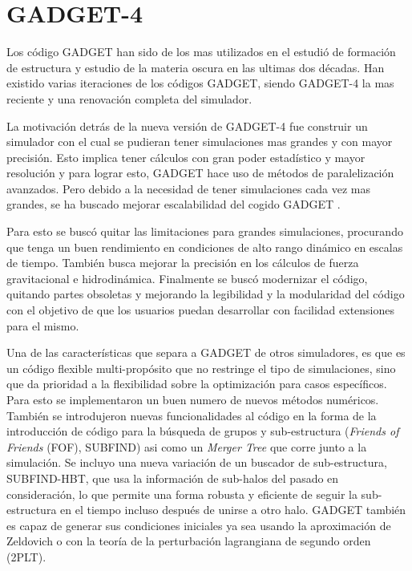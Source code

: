 \section{GADGET-4}

Los código GADGET han sido de los mas utilizados en el estudió de formación de estructura y estudio de la materia oscura en las ultimas dos décadas. Han existido varias iteraciones de los códigos GADGET, siendo GADGET-4 la mas reciente y una renovación completa del simulador. 

La motivación detrás de la nueva versión de GADGET-4 fue construir un simulador con el cual se pudieran tener simulaciones mas grandes y con mayor precisión. Esto implica tener cálculos con gran poder estadístico y mayor resolución y para lograr esto, GADGET hace uso de métodos de paralelización avanzados. Pero debido a la necesidad de tener simulaciones cada vez mas grandes, se ha buscado mejorar escalabilidad del cogido GADGET \cite{2021MNRAS.506.2871S}.

Para esto se buscó quitar las limitaciones para grandes simulaciones, procurando que tenga un buen rendimiento en condiciones de alto rango dinámico en escalas de tiempo. También busca mejorar la precisión en los cálculos de fuerza gravitacional e hidrodinámica. Finalmente se buscó modernizar el código, quitando partes obsoletas y mejorando la legibilidad y la modularidad del código con el objetivo de que los usuarios puedan desarrollar con facilidad extensiones para el mismo. 

 
Una de las características que separa a GADGET de otros simuladores, es que es un código flexible multi-propósito que no restringe el tipo de simulaciones, sino que da prioridad a la flexibilidad  sobre la optimización para casos específicos. Para esto se implementaron un buen numero de nuevos métodos numéricos. También se introdujeron nuevas funcionalidades al código en la forma de la introducción de código para la búsqueda de grupos y sub-estructura (\textit{Friends of Friends} (FOF), SUBFIND) asi como un \textit{Merger Tree} que corre junto a la simulación. Se incluyo una nueva variación de un buscador de sub-estructura, SUBFIND-HBT, que usa la información de sub-halos del pasado en consideración, lo que permite una forma robusta y eficiente de seguir la sub-estructura en el tiempo incluso después de unirse a otro halo. GADGET también es capaz de generar sus condiciones iniciales ya sea usando la aproximación de Zeldovich o con la teoría de la perturbación lagrangiana de segundo orden (2PLT)\cite{2021MNRAS.506.2871S}.


